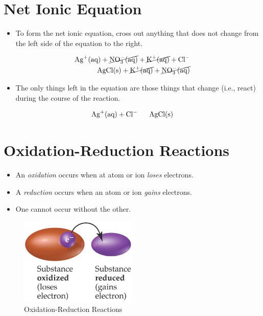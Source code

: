 \documentclass[
	chapter=4
]{chem122notes}
\begin{document}
\section{Net Ionic Equation}\label{sec:net-ionic-equation}
\begin{itemize}
	\item To form the net ionic equation, cross out anything that does not change from the left side of the equation to the right.
\end{itemize}
\begin{equation*}
	\begin{aligned}
		\element{Ag}^{+} (\mbox{aq}) + \cancel{\element{N}\element{O}[3]^{-} (\mbox{aq})} + \cancel{\element{K}^{+} (\mbox{aq})} + \element{Cl}^{-}\\
		\element{Ag}\element{Cl} (\mbox{s}) + \cancel{\element{K}^{+} (\mbox{aq})} + \cancel{\element{N}\element{O}[3]^{-} (\mbox{aq})}\\
	\end{aligned}
\end{equation*}
\begin{itemize}
	\item The only things left in the equation are those things that change (i.e., react) during the course of the reaction.
\end{itemize}
\begin{equation*}
	\begin{aligned}
		\element{Ag}^{+} (\mbox{aq}) + \element{Cl}^{-}\ \ \ \ \ \element{Ag}\element{Cl} (\mbox{s})
	\end{aligned}
\end{equation*}

\section{Oxidation-Reduction Reactions}\label{sec:oxidation-reduction-reactions}
\begin{itemize}
	\item An \emph{oxidation} occurs when at atom or ion \textit{loses} electrons.
	\item A \emph{reduction} occurs when an atom or ion \textit{gains} electrons.
	\item One cannot occur without the other.
\end{itemize}

\begin{figure}[H]
	\centering
	\includegraphics[width=0.5\textwidth]{chapter4/oxidation-reduction}
	\caption{Oxidation-Reduction Reactions}
	\label{fig:oxidation-reduction}
\end{figure}
\end{document}
